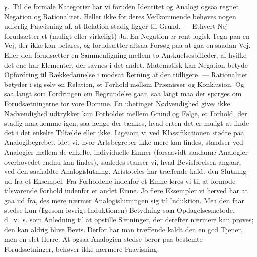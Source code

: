 \documentclass[12pt]{article}
\newcommand{\opage}[1]{\marginnote{\footnotesize\textit{[#1]}}}
\begin{document}
%
\label{sec:3b-gamma}%
γ.~Til de formale Kategorier har vi foruden Identitet og Analogi ogsaa
regnet Negation og Rationalitet. Heller ikke for deres Vedkommende
behøves nogen udførlig Paavisning af, at Relation stadig ligger til
Grund. --- Ethvert Nej forudsætter et (muligt eller virkeligt) Ja. En
Negation er rent logisk Tegn paa en Vej, der ikke kan befares, og
forudsætter altsaa Forsøg paa at gaa en saadan Vej. Eller den
forudsætter en Sammenligning mellem to Anskuelsesbilleder, af hvilke det
ene har Elementer, der savnes i det andet. Matematisk kan Negation
betyde Opfordring til Rækkedannelse i modsat Retning af den tidligere.
--- Rationalitet betyder i sig selv en Relation, et Forhold mellem
Præmisser og Konklusion. Og saa langt som Fordringen om Begrundelse
gaar, saa langt maa der spørges om Forudsætningerne for vore Domme. En
ubetinget Nødvendighed gives ikke. Nødvendighed udtrykker kun Forholdet
mellem Grund og Følge, et Forhold, der stadig maa komme igen, saa længe
der tænkes, hvad enten det er muligt at finde det i det enkelte Tilfælde
eller ikke. Ligesom vi ved Klassifikationen stødte paa Analogibegrebet,
idet vi, hvor Artsbegreber ikke mere kan findes, standser ved Analogier
mellem de enkelte, individuelle Emner (forsaavidt saadanne Analogier
overhovedet endnu kan findes), saaledes stanser vi, hvad Bevisførelsen
angaar, ved den saakaldte Analogislutning. Aristoteles har træffende
kaldt den Slutning ud fra et Eksempel. Fra Forholdene indenfor et Emne
føres vi til at formode tilsvarende Forhold indenfor et andet Emne. Jo
flere Eksempler vi herved har at gaa ud fra,
\opage{45} des mere nærmer Analogislutningen sig til Induktion. Men den faar stedse
kun (ligesom iøvrigt Induktionen) Betydning som Opdagelsesmetode,
d.~v.~s. som Anledning til at opstille Sætninger, der derefter nærmere
kan prøves; den kan aldrig blive Bevis. Derfor har man træffende kaldt
den en god Tjener, men en slet Herre. At ogsaa Analogien stedse beror
paa bestemte Forudsætninger, behøver ikke nærmere Paavisning.

\end{document}

